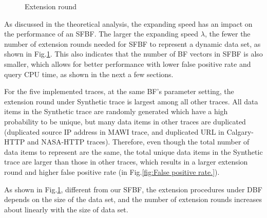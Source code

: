 \documentclass[10pt,journal,letterpaper]{IEEEtran}
\newcommand{\note}[1]{{\sffamily\itshape\bfseries\uline{#1}}}
\begin{document}
\begin{figure}[!htb]
{\label{fig:Extension round test1 actualdata webcache 1.}}
\caption{Extension round}
\label{fig:Extension round.}
\end{figure}

As discussed in the theoretical analysis, the expanding speed has an impact on the performance of an SFBF. The larger the expanding speed $\lambda$, the fewer the number of extension rounds needed for SFBF to represent a dynamic data set, as shown in Fig.\ref{fig:Extension round.}. This also indicates that the number of BF vectors in SFBF is also smaller, which allows for better performance with lower false positive rate and query CPU time, as shown in the next a few sections.

For the five implemented traces, at the same BF's parameter setting, the extension round under Synthetic trace is largest among all other traces. All data items in the Synthetic trace are randomly generated which have a high probability to be unique, but many data items in other traces are duplicated (duplicated source IP address in  MAWI trace, and duplicated URL in Calgary-HTTP and NASA-HTTP traces). Therefore, even though the total number of data items to represent are the same, the total unique data items in the Synthetic trace are larger than those in other traces, which results in a larger extension round and higher false positive rate (in Fig.\ref{fig:False positive rate.}).

As shown in Fig.\ref{fig:Extension round.}, different from our SFBF, the extension procedures under DBF depends on the size of the data set, and the number of extension rounds increases about linearly with the size of data set.

\end{document}
